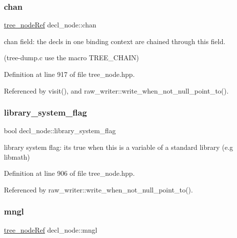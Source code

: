 \subsubsection{\texorpdfstring{chan}{chan}}
{\footnotesize\ttfamily \hyperlink{tree__node_8hpp_a6ee377554d1c4871ad66a337eaa67fd5}{tree\+\_\+node\+Ref} decl\+\_\+node\+::chan}



chan field\+: the decls in one binding context are chained through this field. 

(tree-\/dump.\+c use the macro T\+R\+E\+E\+\_\+\+C\+H\+A\+IN) 

Definition at line 917 of file tree\+\_\+node.\+hpp.



Referenced by visit(), and raw\+\_\+writer\+::write\+\_\+when\+\_\+not\+\_\+null\+\_\+point\+\_\+to().

\mbox{\label{structdecl__node_a64f029e5a78c2a08b2739ede17c9c411}} 
\subsubsection{\texorpdfstring{library\+\_\+system\+\_\+flag}{library\_system\_flag}}
{\footnotesize\ttfamily bool decl\+\_\+node\+::library\+\_\+system\+\_\+flag}



library system flag\+: it\textquotesingle{}s true when this is a variable of a standard library (e.\+g libmath) 



Definition at line 906 of file tree\+\_\+node.\+hpp.



Referenced by raw\+\_\+writer\+::write\+\_\+when\+\_\+not\+\_\+null\+\_\+point\+\_\+to().

\mbox{\label{structdecl__node_ae9845371426b7437237a5d9b4c23e5b4}} 
\subsubsection{\texorpdfstring{mngl}{mngl}}
{\footnotesize\ttfamily \hyperlink{tree__node_8hpp_a6ee377554d1c4871ad66a337eaa67fd5}{tree\+\_\+node\+Ref} decl\+\_\+node\+::mngl}



